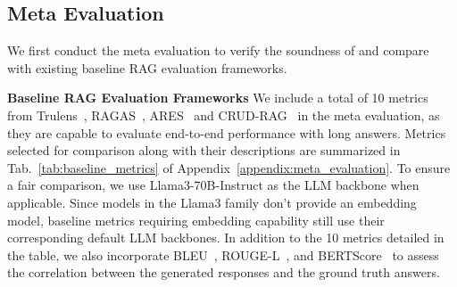\subsection{Meta Evaluation}
\label{sec:meta_evaluation}
We first conduct the meta evaluation to verify the soundness of \benchname\space and compare with existing baseline RAG evaluation frameworks. 

\textbf{Baseline RAG Evaluation Frameworks} We include a total of 10 metrics from Trulens~\cite{TruLens}, RAGAS~\cite{es2023ragas}, ARES~\cite{saadfalcon2023ares} and CRUD-RAG~\cite{lyu2024crud} in the meta evaluation, as they are capable to evaluate end-to-end performance with long answers. Metrics selected for comparison along with their descriptions are summarized in Tab.~\ref{tab:baseline_metrics} of Appendix~\ref{appendix:meta_evaluation}. 
To ensure a fair comparison, we use Llama3-70B-Instruct as the LLM backbone when applicable. Since models in the Llama3 family don't provide an embedding model, baseline metrics requiring embedding capability still use their corresponding default LLM backbones.
In addition to the 10 metrics detailed in the table, we also incorporate BLEU~\cite{papineni2002bleu}, ROUGE-L~\cite{lin2004rouge}, and BERTScore~\cite{zhang2019bertscore} to assess the correlation between the generated responses and the ground truth answers.

